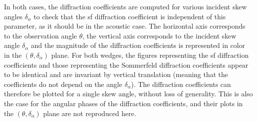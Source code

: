 In both cases, the diffraction coefficients are computed for various incident skew angles $\delta_{\alpha}$ to check that the \acrshort{sf} diffraction coefficient is independent of this parameter, as it should be in the acoustic case. The horizontal axis corresponds to the observation angle $\theta$, the vertical axis corresponds to the incident skew angle $\delta_{\alpha}$ and the magnitude of the diffraction coefficients is represented in color in the $(\theta,\delta_{\alpha})$ plane. For both wedges, the figures representing the \acrshort{sf} diffraction coefficients and those representing the Sommerfeld diffraction coefficients appear to be identical and are invariant by vertical translation (meaning that the coefficients do not depend on the angle $\delta_{\alpha}$). The diffraction coefficients can therefore be plotted for a single skew angle, without loss of generality. This is also the case for the angular phases of the diffraction coefficients, and their plots in the $(\theta,\delta_{\alpha})$ plane are not reproduced here.

